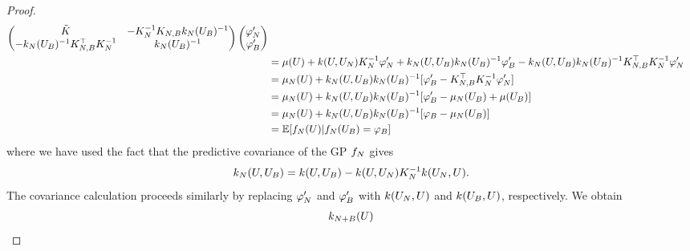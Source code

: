 \documentclass[12pt]{article}
\begin{document}
\begin{proof}
\begin{align*}
\begin{pmatrix} \tilde{K} & -\kerMat[\Ndesign]^{-1} \kerMat[\Ndesign,\Nbatch] \gpKer[\Ndesign](\designBatchIn)^{-1} \\
-\gpKer[\Ndesign](\designBatchIn)^{-1} \kerMat[\Ndesign,\Nbatch]^\top  \kerMat[\Ndesign]^{-1} & \gpKer[\Ndesign](\designBatchIn)^{-1} \end{pmatrix} 
\begin{pmatrix}  \funcVal[\Ndesign]^\prime \\  \funcVal[\Nbatch]^\prime \end{pmatrix} \\
&= \gpMeanPrior(\parMat) + \gpKerPrior(\parMat, \designIn[\Ndesign])\kerMat[\Ndesign]^{-1}\funcVal[\Ndesign]^\prime + 
\gpKer[\Ndesign](\parMat, \designIn[\Nbatch]) \gpKer[\Ndesign](\designIn[\Nbatch])^{-1} \funcVal[\Nbatch]^\prime - 
\gpKer[\Ndesign](\parMat, \designIn[\Nbatch]) \gpKer[\Ndesign](\designIn[\Nbatch])^{-1} \kerMat[\Ndesign,\Nbatch]^\top \kerMat[\Ndesign]^{-1} \funcVal[\Ndesign]^\prime \\
&= \gpMean[\Ndesign](\parMat) + \gpKer[\Ndesign](\parMat, \designIn[\Nbatch]) \gpKer[\Ndesign](\designIn[\Nbatch])^{-1}[\funcVal[\Nbatch]^\prime - \kerMat[\Ndesign,\Nbatch]^\top \kerMat[\Ndesign]^{-1} \funcVal[\Ndesign]^\prime] \\
&= \gpMean[\Ndesign](\parMat) + \gpKer[\Ndesign](\parMat, \designIn[\Nbatch]) \gpKer[\Ndesign](\designIn[\Nbatch])^{-1}[\funcVal[\Nbatch]^\prime - \gpMean[\Ndesign](\designIn[\Nbatch]) + \gpMeanPrior(\designIn[\Nbatch])] \\
&= \gpMean[\Ndesign](\parMat) + \gpKer[\Ndesign](\parMat, \designIn[\Nbatch]) \gpKer[\Ndesign](\designIn[\Nbatch])^{-1}[\funcVal[\Nbatch] - \gpMean[\Ndesign](\designIn[\Nbatch])] \\
&= \E[\funcEm[\Ndesign](\parMat) | \funcEm[\Ndesign](\designIn[\Nbatch]) = \funcVal[\Nbatch]] 
\end{align*}
where we have used the fact that the predictive covariance of the GP $\funcEm[\Ndesign]$ gives 
\[
\gpKer[\Ndesign](\parMat, \designIn[\Nbatch]) = \gpKerPrior(\parMat, \designIn[\Nbatch]) - 
\gpKerPrior(\parMat, \designIn[\Ndesign])\kerMat[\Ndesign]^{-1} \gpKerPrior(\designIn[\Ndesign], \parMat).
\]
The covariance calculation proceeds similarly by replacing $\funcVal[\Ndesign]^\prime$ and $\funcVal[\Nbatch]^\prime$ with 
$\gpKerPrior(\designIn[\Ndesign], \parMat)$ and $\gpKerPrior(\designIn[\Nbatch], \parMat)$, respectively. We obtain 
\begin{align*}
\gpKer[\Naugment](\parMat)

\end{align*}
\end{proof}
\end{document}
